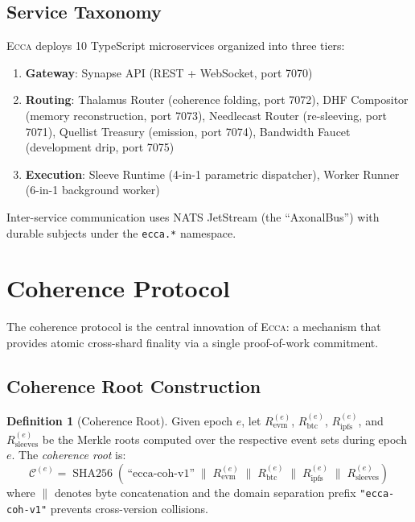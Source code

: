 \documentclass[11pt,twocolumn]{article}
\theoremstyle{definition}
\newtheorem{definition}{Definition}[section]
\theoremstyle{plain}
\theoremstyle{remark}
\newcommand{\ecca}{\textsc{Ecca}}
\DeclareMathOperator{\shatwofiftysix}{SHA256}
\begin{document}
\subsection{Service Taxonomy}

\ecca{} deploys 10 TypeScript microservices organized into three tiers:

\begin{enumerate}[leftmargin=*]
  \item \textbf{Gateway}: Synapse API (REST + WebSocket, port 7070)
  \item \textbf{Routing}: Thalamus Router (coherence folding, port 7072), DHF Compositor (memory reconstruction, port 7073), Needlecast Router (re-sleeving, port 7071), Quellist Treasury (emission, port 7074), Bandwidth Faucet (development drip, port 7075)
  \item \textbf{Execution}: Sleeve Runtime (4-in-1 parametric dispatcher), Worker Runner (6-in-1 background worker)
\end{enumerate}

Inter-service communication uses NATS JetStream (the ``AxonalBus'') with durable subjects under the \texttt{ecca.*} namespace.

\section{Coherence Protocol}\label{sec:coherence}

The coherence protocol is the central innovation of \ecca{}: a mechanism that provides atomic cross-shard finality via a single proof-of-work commitment.

\subsection{Coherence Root Construction}

\begin{definition}[Coherence Root]\label{def:coherence-root}
Given epoch $e$, let $R_{\mathrm{evm}}^{(e)}$, $R_{\mathrm{btc}}^{(e)}$, $R_{\mathrm{ipfs}}^{(e)}$, and $R_{\mathrm{sleeves}}^{(e)}$ be the Merkle roots computed over the respective event sets during epoch $e$. The \emph{coherence root} is:
\begin{equation}\label{eq:coherence-root}
  \mathcal{C}^{(e)} = \shatwofiftysix\!\left(\,\text{``ecca-coh-v1''} \;\|\; R_{\mathrm{evm}}^{(e)} \;\|\; R_{\mathrm{btc}}^{(e)} \;\|\; R_{\mathrm{ipfs}}^{(e)} \;\|\; R_{\mathrm{sleeves}}^{(e)}\right)
\end{equation}
where $\|$ denotes byte concatenation and the domain separation prefix \texttt{"ecca-coh-v1"} prevents cross-version collisions.
\end{definition}
\end{document}
